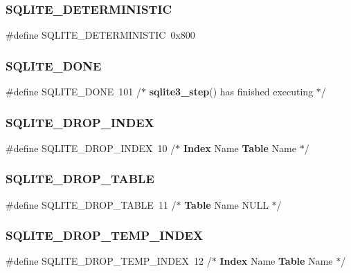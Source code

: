 \subsubsection{SQLITE\_DETERMINISTIC}
{\footnotesize\ttfamily \#define S\+Q\+L\+I\+T\+E\+\_\+\+D\+E\+T\+E\+R\+M\+I\+N\+I\+S\+T\+IC~0x800}

\mbox{\label{sqlite3_8h_afd1d7cc5f2e803af5e944f548e28f141}} 
\subsubsection{SQLITE\_DONE}
{\footnotesize\ttfamily \#define S\+Q\+L\+I\+T\+E\+\_\+\+D\+O\+NE~101  /$\ast$ \textbf{ sqlite3\+\_\+step}() has finished executing $\ast$/}

\mbox{\label{sqlite3_8h_ac285cb102ca0ced83ce8eaf34de49f2c}} 
\subsubsection{SQLITE\_DROP\_INDEX}
{\footnotesize\ttfamily \#define S\+Q\+L\+I\+T\+E\+\_\+\+D\+R\+O\+P\+\_\+\+I\+N\+D\+EX~10   /$\ast$ \textbf{ Index} Name      \textbf{ Table} Name      $\ast$/}

\mbox{\label{sqlite3_8h_a2438239bdc66129189a9f3cdcc41096e}} 
\subsubsection{SQLITE\_DROP\_TABLE}
{\footnotesize\ttfamily \#define S\+Q\+L\+I\+T\+E\+\_\+\+D\+R\+O\+P\+\_\+\+T\+A\+B\+LE~11   /$\ast$ \textbf{ Table} Name      N\+U\+LL            $\ast$/}

\mbox{\label{sqlite3_8h_a33f05725c280233f7a2bce538d862d63}} 
\subsubsection{SQLITE\_DROP\_TEMP\_INDEX}
{\footnotesize\ttfamily \#define S\+Q\+L\+I\+T\+E\+\_\+\+D\+R\+O\+P\+\_\+\+T\+E\+M\+P\+\_\+\+I\+N\+D\+EX~12   /$\ast$ \textbf{ Index} Name      \textbf{ Table} Name      $\ast$/}

